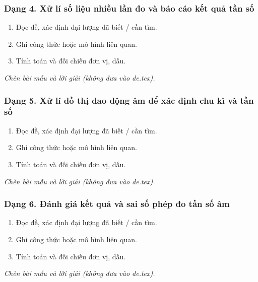 \subsubsection{Dạng 4. Xử lí số liệu nhiều lần đo và báo cáo kết quả tần số}
\begin{phuongphap}
\begin{enumerate}
\item Đọc đề, xác định đại lượng đã biết / cần tìm.
\item Ghi công thức hoặc mô hình liên quan.
\item Tính toán và đối chiếu đơn vị, dấu.
\end{enumerate}
\end{phuongphap}
\begin{vidumau}
\textit{Chèn bài mẫu và lời giải (không đưa vào de.tex).}
\end{vidumau}

\subsubsection{Dạng 5. Xử lí đồ thị dao động âm để xác định chu kì và tần số}
\begin{phuongphap}
\begin{enumerate}
\item Đọc đề, xác định đại lượng đã biết / cần tìm.
\item Ghi công thức hoặc mô hình liên quan.
\item Tính toán và đối chiếu đơn vị, dấu.
\end{enumerate}
\end{phuongphap}
\begin{vidumau}
\textit{Chèn bài mẫu và lời giải (không đưa vào de.tex).}
\end{vidumau}

\subsubsection{Dạng 6. Đánh giá kết quả và sai số phép đo tần số âm}
\begin{phuongphap}
\begin{enumerate}
\item Đọc đề, xác định đại lượng đã biết / cần tìm.
\item Ghi công thức hoặc mô hình liên quan.
\item Tính toán và đối chiếu đơn vị, dấu.
\end{enumerate}
\end{phuongphap}
\begin{vidumau}
\textit{Chèn bài mẫu và lời giải (không đưa vào de.tex).}
\end{vidumau}

